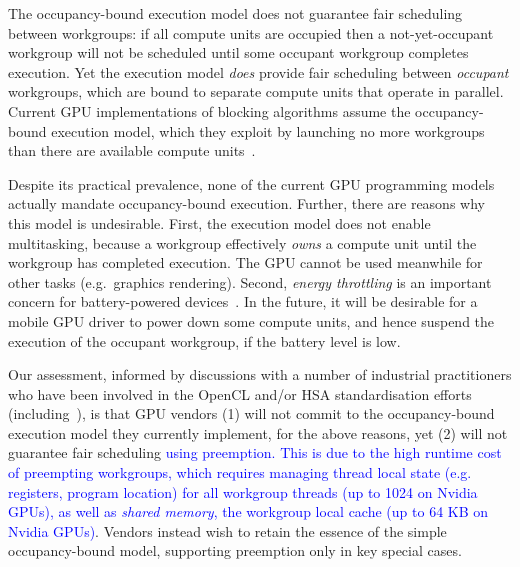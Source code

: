 \documentclass[sigconf]{acmart}
\newcommand{\TSAdded}[1]{\textcolor{blue}{#1}}
\begin{document}
The occupancy-bound execution model does not guarantee fair scheduling
between workgroups: if all compute units are occupied then a
not-yet-occupant workgroup will not be scheduled until some occupant
workgroup completes execution.  Yet the execution model \emph{does}
provide fair scheduling between \emph{occupant} workgroups, which are
bound to separate compute units that operate in parallel.  Current GPU
implementations of blocking algorithms assume the occupancy-bound
execution model, which they exploit by launching no more workgroups
than there are available compute units~\cite{owens-persistent}.

Despite its practical prevalence, none of the current GPU programming
models actually mandate occupancy-bound execution.  Further, there are
reasons why this model is undesirable.
First, the execution model does not enable
multitasking, because a workgroup effectively \emph{owns} a compute
unit until the workgroup has completed execution.  The GPU cannot be used meanwhile for other
tasks (e.g.\ graphics rendering).
Second, \emph{energy throttling} is an important concern for
battery-powered
devices~\cite{DBLP:journals/comsur/Vallina-RodriguezC13}.  In the
future, it will be desirable for a mobile GPU driver to power down
some compute units, and hence suspend the execution of the occupant
workgroup, if the battery level is low.

Our assessment, informed by discussions with a number of industrial
practitioners who have been involved in the OpenCL and/or HSA
standardisation efforts
(including~\cite{PersonalCommunicationRichards,PersonalCommunicationHowes}),
is that GPU vendors (1) will not commit to the occupancy-bound
execution model they currently implement, for the above reasons, yet
(2) will not guarantee fair scheduling \TSAdded{using preemption. This
  is due to the high runtime cost of preempting workgroups, which
  requires managing thread local state (e.g. registers, program
  location) for all workgroup threads (up to 1024 on Nvidia
  GPUs), as well as \emph{shared memory}, the workgroup local cache
  (up to 64 KB on Nvidia GPUs)}.  Vendors instead wish to retain the
essence of the simple occupancy-bound model, supporting preemption
only in key special cases.
\end{document}
